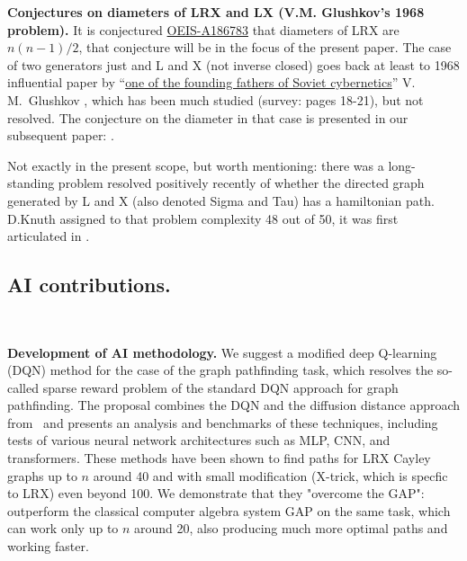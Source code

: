 \documentclass[reqno,11pt]{amsart}
\begin{document}
{\bf Conjectures on diameters of LRX and LX (V.M. Glushkov's 1968 problem).} 
It is conjectured \href{https://oeis.org/A186783}{OEIS-A186783} that diameters of LRX are $n(n-1)/2$,
that conjecture will be in the focus of the present paper. 
The case of two generators just and L and X (not inverse closed) goes back at least to 1968 influential paper by
``\href{https://en.wikipedia.org/wiki/Victor_Glushkov}{one of the founding fathers of Soviet cybernetics}'' V.\,M.~Glushkov 
\cite{glushkov1968completeness}, which has been much studied (survey: \cite{glukhovzubov1999lengths} pages 18-21),
but not resolved. The conjecture on the diameter in that case is presented in our subsequent paper: \cite{CayleyPyGrowth}.

Not exactly in the present scope, but worth mentioning: there was a long-standing problem resolved positively recently \cite{SawadaWilliams2019SigmaTau} of whether the directed graph generated by L and X (also denoted Sigma and Tau)
has a hamiltonian path.  D.Knuth assigned to that problem complexity 48 out of 50, it was first articulated in
\cite{NijenhuisWilf1975CombinatorialAlgorithms}.

\subsection{ AI contributions.  }~ %

{\bf Development of AI methodology.} We suggest a modified deep Q-learning (DQN) method for the case of the graph pathfinding task, which resolves the so-called sparse reward problem of the standard DQN approach for graph pathfinding. The proposal combines the DQN and the diffusion distance approach from~\cite{chervov2025machinelearningapproachbeats} and presents an analysis and benchmarks of these techniques, including tests of various neural network architectures such as MLP, CNN, and transformers. %
These methods have been shown to find paths for LRX Cayley graphs up to $n$ around 40 and with small modification (X-trick, which is specfic to LRX) even beyond 100.
We demonstrate that they "overcome the GAP": outperform the classical computer algebra system GAP on the same task, which can work only up to $n$ around 20, also producing much more optimal paths and working faster.
\end{document}
